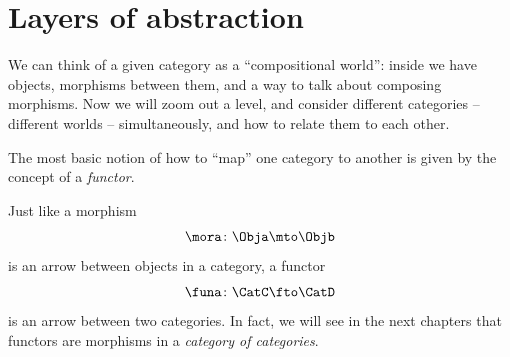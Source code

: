 
\section{Layers of abstraction}
\label{sec:functors-intro}


We can think of a given category \CatC as a ``compositional world'': inside \CatC we have objects, morphisms between them, and a way to talk about composing morphisms.
Now we will zoom out a level, and consider different categories -- different worlds -- simultaneously, and how to relate them to each other.

The most basic notion of how to ``map'' one category to another is given by the concept of a \emph{functor}.

Just like a morphism
%
\begin{equation}
    \mora \colon \Obja \mto \Objb
\end{equation}
%
is an arrow between objects in a category, a functor
%
\begin{equation}
    \funa \colon \CatC \fto \CatD
\end{equation}
%
is an arrow between two categories.
In fact, we will see in the next chapters that functors are morphisms in a \emph{category of categories}.


